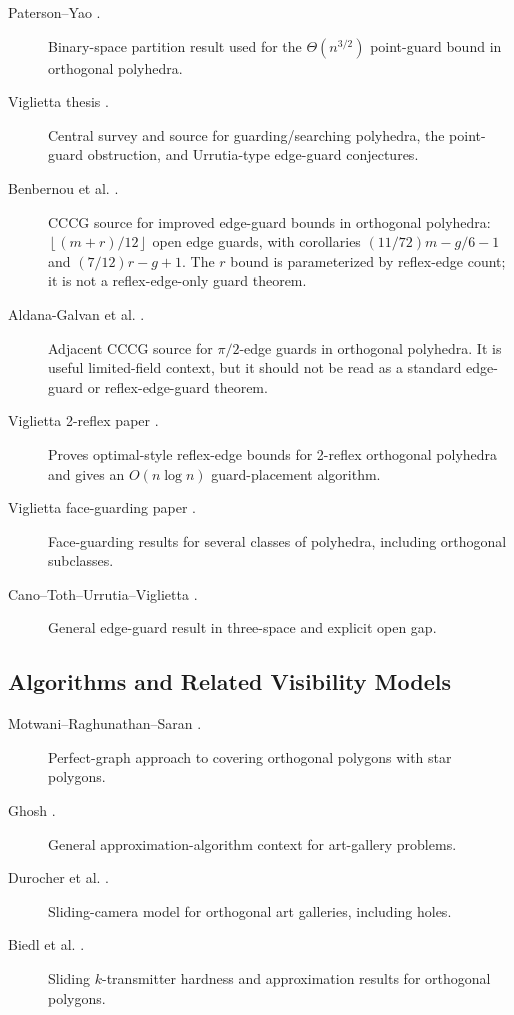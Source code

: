 \documentclass[11pt]{article}
\newcommand{\floor}[1]{\left\lfloor #1 \right\rfloor}
\begin{document}
\begin{description}
  \item[Paterson--Yao \cite{PatersonYao1992}.]
  Binary-space partition result used for the $\Theta(n^{3/2})$ point-guard
  bound in orthogonal polyhedra.

  \item[Viglietta thesis \cite{VigliettaThesis}.]
  Central survey and source for guarding/searching polyhedra, the point-guard
  obstruction, and Urrutia-type edge-guard conjectures.

  \item[Benbernou et al. \cite{BenbernouEtAl2011}.]
  CCCG source for improved edge-guard bounds in orthogonal polyhedra:
  $\floor{(m+r)/12}$ open edge guards, with corollaries
  $(11/72)m-g/6-1$ and $(7/12)r-g+1$.  The $r$ bound is parameterized by
  reflex-edge count; it is not a reflex-edge-only guard theorem.

  \item[Aldana-Galvan et al. \cite{AldanaGalvanEtAl2016}.]
  Adjacent CCCG source for $\pi/2$-edge guards in orthogonal polyhedra.  It is
  useful limited-field context, but it should not be read as a standard
  edge-guard or reflex-edge-guard theorem.

  \item[Viglietta 2-reflex paper \cite{Viglietta2020}.]
  Proves optimal-style reflex-edge bounds for 2-reflex orthogonal polyhedra and
  gives an $O(n\log n)$ guard-placement algorithm.

  \item[Viglietta face-guarding paper \cite{VigliettaFace2014}.]
  Face-guarding results for several classes of polyhedra, including orthogonal
  subclasses.

  \item[Cano--Toth--Urrutia--Viglietta \cite{CanoTothUrrutiaViglietta2022}.]
  General edge-guard result in three-space and explicit open gap.
\end{description}

\subsection*{Algorithms and Related Visibility Models}

\begin{description}
  \item[Motwani--Raghunathan--Saran \cite{MotwaniRaghunathanSaran1990}.]
  Perfect-graph approach to covering orthogonal polygons with star polygons.

  \item[Ghosh \cite{Ghosh2010}.]
  General approximation-algorithm context for art-gallery problems.

  \item[Durocher et al. \cite{DurocherEtAl2017}.]
  Sliding-camera model for orthogonal art galleries, including holes.

  \item[Biedl et al. \cite{BiedlEtAl2019}.]
  Sliding $k$-transmitter hardness and approximation results for orthogonal
  polygons.
\end{description}
\end{document}
